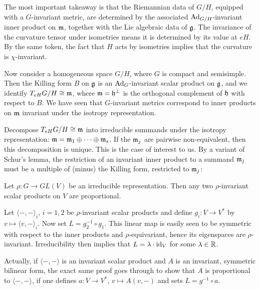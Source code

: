 The most important takeaway is that the Riemannian data of $G/H$, equipped with a $G$-invariant metric, are determined by the associated $\operatorname{Ad}_{G/H}$-invariant inner product on $\mathfrak{m}$, together with the Lie algebraic data of $\mathfrak{g}$. The invariance of the curvature tensor under isometries means it is determined by its value at $eH$. By the same token, the fact that $H$ acts by isometries implies that the curvature is $\chi$-invariant.

Now consider a homogeneous space $G/H$, where $G$ is compact and semisimple. Then the Killing form $B$ on $\mathfrak{g}$ is an $\operatorname{Ad}_G$-invariant scalar product on $\mathfrak{g}$, and we identify $T_{eH}G/H\cong \mathfrak{m}$, where $\mathfrak{m}=\mathfrak{h}^\perp$ is the orthogonal complement of $\mathfrak{h}$ with respect to $B$. We have seen that $G$-invariant metrics correspond to inner products on $\mathfrak{m}$ invariant under the isotropy representation. 

Decompose $T_{eH}G/H\cong \mathfrak{m}$ into irreducible summands under the isotropy representation: $\mathfrak{m}=\mathfrak{m}_1\oplus\dots\oplus \mathfrak{m}_s$. If the $\mathfrak{m}_j$ are pairwise non-equivalent, then this decomposition is unique. This is the case of interest to us. By a variant of Schur's lemma, the restriction of an invariant inner product to a summand $\mathfrak{m}_j$ must be a multiple of (minus) the Killing form, restricted to $\mathfrak{m}_j$:

\begin{lem}\label{lem:Schurscalarproducts}
	Let $\rho:G\to GL(V)$ be an irreducible representation. Then any two $\rho$-invariant scalar products on $V$ are proportional.
\end{lem}
\begin{myproof}
	Let $\langle -,-\rangle_i$, $i=1,2$ be $\rho$-invariant scalar products and define $g_i:V\to V^*$ by $v\mapsto \langle v,-\rangle_i$. Now set $L=g_2^{-1}\circ g_1$. This linear map is easily seen to be symmetric with respect to the inner products and $\rho$-equivariant, hence its eigenspaces are $\rho$-invariant. Irreducibility then implies that $L=\lambda\cdot \operatorname{id}_V$ for some $\lambda\in \mathbb{R}$.
\end{myproof}

\begin{rem}
	Actually, if $\langle -,-\rangle$ is an invariant scalar product and $A$ is an invariant, symmetric bilinear form, the exact same proof goes through to show that $A$ is proportional to $\langle-,-\rangle$, if one defines $a:V\to V^*$, $v\mapsto A(v,-)$ and sets $L=g^{-1}\circ a$. 
\end{rem}

